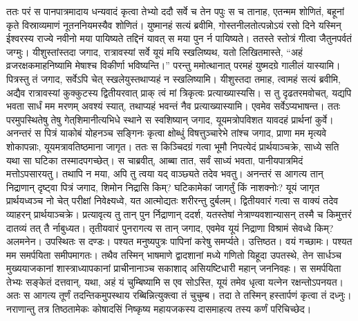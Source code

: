 \vakya ततः परं स पानपात्रमादाय धन्यवादं कृत्वा तेभ्यो ददौ सर्वे च तेन पपुः
\vakya स च तानाह, एतन्मम शोणितं, बहूनां कृते विस्राव्यमाणं नूतननियमस्यैव शोणितं।
\vakya युष्मानहं सत्यं ब्रवीमि, गोस्तनीलतोत्पन्नोऽयं रसो दिने यस्मिन् ईश्वरस्य राज्ये नवीनो मया पायिष्यते तद्दिनं यावत् स मया पुन र्न पायिष्यते।
\vakya ततस्ते स्तोत्रं गीत्वा जैतुनपर्वतं जग्मुः।
\vakya यीशुस्तांस्तदा जगाद, रात्रावस्यां सर्वे यूयं मयि स्खलिष्यथ, यतो लिखितमास्ते, “अहं व्रजरक्षकमाहनिष्यामि मेषाश्च विकीर्णा भविष्यन्ति।”
\vakya परन्तु ममोत्थानात् परमहं युष्मदग्रे गालीलं यास्यामि।
\vakya पित्रस्तु तं जगाद, सर्वेऽपि चेत् स्खलेयुस्तथाप्यहं न स्खलिष्यामि।
\vakya यीशुस्तदा तमाह, त्वामहं सत्यं ब्रवीमि, अद्यैव रात्रावस्यां कुक्कुटस्य द्वितीयरवात् प्राक् त्वं मां त्रिकृत्वः प्रत्याख्यास्यसि।
\vakya स तु दृढतरमवोचत्, यद्यपि भवता सार्धं मम मरणम् अवश्यं स्यात्, तथाप्यहं भवन्तं नैव प्रत्याख्यास्यामि। एवमेव सर्वेऽप्यभाषन्त।
\vakya ततः परमुपस्थितेषु तेषु गेत्‌शिमानीत्यभिधे स्थाने स स्वशिष्यान् जगाद, यूयमत्रोपविशत यावदहं प्रार्थनां कुर्वे।
\vakya अनन्तरं स पित्रं याकोबं योहनञ्च सङ्गिनः कृत्वा क्षोब्धुं विषत्तुञ्चारेभे तांश्च जगाद,
\vakya प्राणा मम मृत्यवे शोकापन्नाः, यूयमत्रावतिष्ठमाना जागृत।
\vakya ततः स किञ्चिदग्रं गत्वा भूमौ निपत्येदं प्रार्थयाञ्चक्रे, साध्ये सति यथा सा घटिका तस्मादपगच्छेत्।
\vakya स चाब्रवीत्, आब्बा तात, सर्वं साध्यं भवता, पानीयपात्रमिदं मत्तोऽपसारयतु। तथापि न मया, अपि तु त्वया यद् वाञ्छ्यते तदेव भवतु।
\vakya अनन्तरं स आगत्य तान् निद्राणान् दृष्ट्वा पित्रं जगाद, शिमोन निद्रासि किम्? घटिकामेकां जागर्तुं किं नाशक्नोः?
\vakya यूयं जागृत प्रार्थयध्वञ्च नो चेत् परीक्षां निवेक्ष्यध्वे, यत आत्मोद्यतः शरीरन्तु दुर्बलम्।
\vakya द्वितीयवारं गत्वा स वाक्यं तदेव व्याहरन् प्रार्थयाञ्चक्रे।
\vakya प्रत्यावृत्य तु तान् पुन र्निद्राणान् ददर्श, यतस्तेषां नेत्राण्यवशान्यासन् तस्मै च किमुत्तरं दातव्यं तत् तै र्नाबुध्यत।
\vakya तृतीयवारं पुनरागत्य स तान् जगाद, एवमेव यूयं निद्राणा विश्रामं सेवध्वे किम्? अलमनेन। उपस्थितः स दण्डः। पश्यत मनुष्यपुत्रः पापिनां करेषु समर्प्यते।
\vakya उत्तिष्ठत। वयं गच्छामः। पश्यत मम समर्पयिता समीपमागतः।
\vakya तथैव तस्मिन् भाषमाणे द्वादशानां मध्ये गणितो यिहूदा उपतस्थे, तेन सार्धञ्च मुख्ययाजकानां शास्त्राध्यापकानां प्राचीनानाञ्च सकाशाद् असियष्टिधारी महान् जननिवहः।
\vakya स समर्पयिता तेभ्यः सङ्केतं दत्तवान्, यथा, अहं यं चुम्बिष्यामि स एव सोऽस्ति, यूयं तमेव धृत्वा यत्नेन रक्षन्तोऽपनयत।
\vakya अतः स आगत्य तूर्णं तदन्तिकमुपस्थाय रब्बिन्नित्युक्त्वा तं चुचुम्ब।
\vakya तदा ते तस्मिन् हस्तार्पणं कृत्वा तं दध्नुः।
\vakya नराणान्तु तत्र तिष्ठतामेकः कोषादसिं निष्कृष्य महायजकस्य दासमाहत्य तस्य कर्णं परिचिच्छेद।
